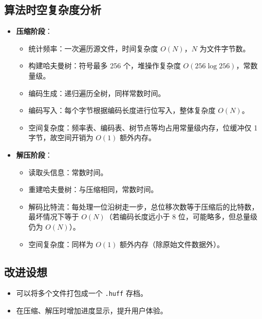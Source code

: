 \documentclass[UTF8]{ctexart}
\begin{document}
\subsection{算法时空复杂度分析}
\begin{itemize}
    \item \textbf{压缩阶段}：
        \begin{itemize}
            \item 统计频率：一次遍历源文件，时间复杂度 \(O(N)\)，\(N\) 为文件字节数。
            \item 构建哈夫曼树：符号最多 256 个，堆操作复杂度 \(O(256 \log 256)\)，常数量级。
            \item 编码生成：递归遍历全树，同样常数时间。
            \item 编码写入：每个字节根据编码长度进行位写入，整体复杂度 \(O(N)\)。
            \item 空间复杂度：频率表、编码表、树节点等均占用常量级内存，位缓冲仅 1 字节，故空间开销为 \(O(1)\) 额外内存。
        \end{itemize}
    \item \textbf{解压阶段}：
        \begin{itemize}
            \item 读取头信息：常数时间。
            \item 重建哈夫曼树：与压缩相同，常数时间。
            \item 解码比特流：每处理一位沿树走一步，总位移次数等于压缩后的比特数，最坏情况下等于 \(O(N)\)（若编码长度远小于 8 位，可能略多，但总量级仍为 \(O(N)\)）。
            \item 空间复杂度：同样为 \(O(1)\) 额外内存（除原始文件数据外）。
        \end{itemize}
\end{itemize}

\subsection{改进设想}
\begin{itemize}
    \item 可以将多个文件打包成一个 \texttt{.huff} 存档。
    \item 在压缩、解压时增加进度显示，提升用户体验。
\end{itemize}
\end{document}
